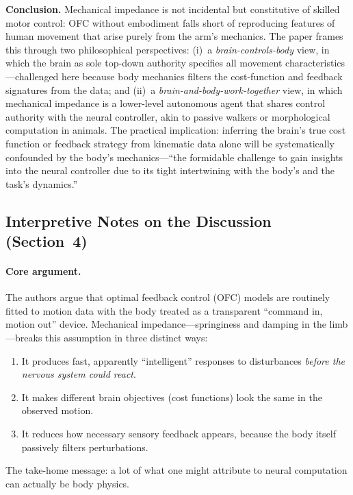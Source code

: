\documentclass[11pt]{article}
\begin{document}
\textbf{Conclusion.}  Mechanical impedance is not incidental but constitutive of skilled motor control: OFC without embodiment falls short of reproducing features of human movement that arise purely from the arm's mechanics.  The paper frames this through two philosophical perspectives: (i)~a \emph{brain-controls-body} view, in which the brain as sole top-down authority specifies all movement characteristics---challenged here because body mechanics filters the cost-function and feedback signatures from the data; and (ii)~a \emph{brain-and-body-work-together} view, in which mechanical impedance is a lower-level autonomous agent that shares control authority with the neural controller, akin to passive walkers or morphological computation in animals.  The practical implication: inferring the brain's true cost function or feedback strategy from kinematic data alone will be systematically confounded by the body's mechanics---``the formidable challenge to gain insights into the neural controller due to its tight intertwining with the body's and the task's dynamics.''

\subsection*{Interpretive Notes on the Discussion (Section~4)}

\paragraph{Core argument.}
The authors argue that optimal feedback control (OFC) models are routinely fitted to motion data with the body treated as a transparent ``command in, motion out'' device.  Mechanical impedance---springiness and damping in the limb---breaks this assumption in three distinct ways:
\begin{enumerate}[leftmargin=1.4em]
  \item It produces fast, apparently ``intelligent'' responses to disturbances \emph{before the nervous system could react}.
  \item It makes different brain objectives (cost functions) look the same in the observed motion.
  \item It reduces how necessary sensory feedback appears, because the body itself passively filters perturbations.
\end{enumerate}
The take-home message: a lot of what one might attribute to neural computation can actually be body physics.
\end{document}
